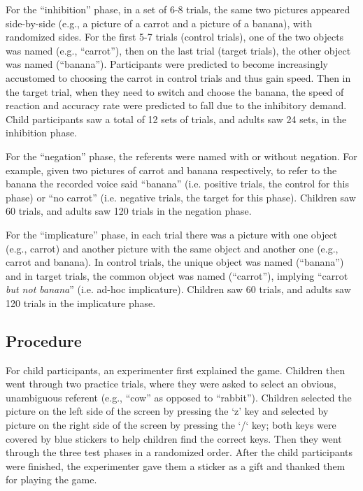 \documentclass[10pt,letterpaper]{article}
\begin{document}
For the ``inhibition'' phase, in a set of 6-8 trials, the same two pictures appeared side-by-side (e.g., a picture of a carrot and a picture of a banana), with randomized sides. For the first 5-7 trials (control trials), one of the two objects was named (e.g., ``carrot''), then on the last trial  (target trials), the other object was named (``banana''). Participants were predicted to become increasingly accustomed to choosing the carrot in control trials and thus gain speed. Then in the target trial, when they need to switch and choose the banana, the speed of reaction and accuracy rate were predicted to fall due to the inhibitory demand. Child participants saw a total of 12 sets of trials, and adults saw 24 sets, in the inhibition phase.

For the ``negation'' phase, the referents were named with or without negation. For example, given two pictures of carrot and banana respectively, to refer to the banana the recorded voice said ``banana'' (i.e. positive trials, the control for this phase) or ``no carrot'' (i.e. negative trials, the target for this phase). Children saw 60 trials, and adults saw 120 trials in the negation phase. 

For the ``implicature'' phase, in each trial there was a picture with one object (e.g., carrot) and another picture with the same object and another one (e.g., carrot and banana). In control trials, the unique object was named (``banana'') and in target trials, the common object was named (``carrot''), implying ``carrot \emph{but not banana}'' (i.e. ad-hoc implicature). Children saw 60 trials, and adults saw 120 trials in the implicature phase.  

\subsection{Procedure}

For child participants, an experimenter first explained the game.  Children then went through two practice trials, where they were asked to select an obvious, unambiguous referent (e.g., ``cow'' as opposed to ``rabbit'').  Children selected the picture on the left side of the screen by pressing the `z' key and selected by picture on the right side of the screen by pressing the `/` key; both keys were covered by blue stickers to help children find the correct keys. Then they went through the three test phases in a randomized order.  After the child participants were finished, the experimenter gave them a sticker as a gift and thanked them for playing the game.
\end{document}
